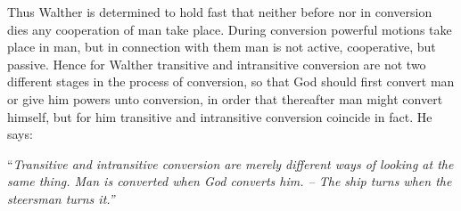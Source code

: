  

 

     Thus Walther is determined to hold fast that neither before nor in conversion dies any cooperation of man take place.  During conversion powerful motions take place in man, but in connection with them man is not active, cooperative, but passive.  Hence for Walther transitive and intransitive conversion are not two different stages in the process of conversion, so that God should first convert man or give him powers unto conversion, in order that thereafter man might convert himself, but for him transitive and intransitive conversion coincide in fact.  He says: \begin{displayquote}“\textit{Transitive and intransitive conversion are merely different ways of looking at the same thing.  Man is converted when God converts him.  -- The ship turns when the steersman turns it.''}\end{displayquote}


